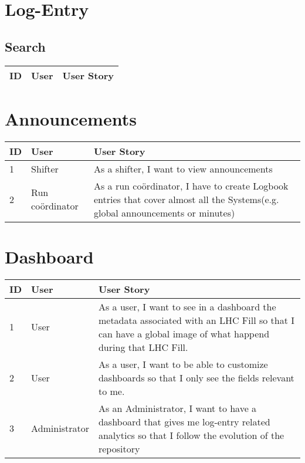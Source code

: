 \documentclass[paper=a4, fontsize=11pt,twoside]{scrartcl}	%
\begin{document}
\section{Log-Entry}

\subsection{Search}
\begin{longtable}{ | p{1cm} | p{5cm} | p{8cm} |}
\hline
ID & User & User Story \\ \hline

\end{longtable}

\section{Announcements}
\begin{longtable}{ | p{1cm} | p{5cm} | p{8cm} |}
\hline
ID & User & User Story \\ \hline
1 & Shifter & As a shifter, I want to view announcements \\ \hline
2& Run co\"ordinator & As a run co\"ordinator, I have to create Logbook entries that cover almost all the Systems(e.g. global announcements or minutes) \\ \hline
\end{longtable}

\section{Dashboard}
\begin{longtable}{ | p{1cm} | p{5cm} | p{8cm} |}
\hline
ID & User & User Story \\ \hline
1 & User & As a user, I want to see in a dashboard the metadata associated with an LHC Fill so that I can have a global image of what happend during that LHC Fill. \\ \hline
2 & User & As a user, I want to be able to customize dashboards so that I only see the fields relevant to me. \\ \hline
3 & Administrator & As an Administrator, I want to have a dashboard that gives me log-entry related analytics so that I follow the evolution of the repository \\ \hline
\end{longtable}
\end{document}
